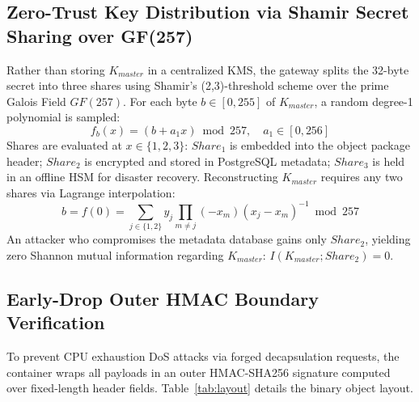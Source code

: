 \documentclass{llncs}
\begin{document}
\subsection{Zero-Trust Key Distribution via Shamir Secret Sharing over GF(257)}
Rather than storing $K_{master}$ in a centralized KMS, the gateway splits the 32-byte secret into three shares using Shamir's (2,3)-threshold scheme over the prime Galois Field $GF(257)$. For each byte $b \in [0, 255]$ of $K_{master}$, a random degree-1 polynomial is sampled:
\begin{equation}
f_b(x) = (b + a_1 x) \bmod 257, \quad a_1 \in [0, 256]
\end{equation}
Shares are evaluated at $x \in \{1, 2, 3\}$: $Share_1$ is embedded into the object package header; $Share_2$ is encrypted and stored in PostgreSQL metadata; $Share_3$ is held in an offline HSM for disaster recovery. Reconstructing $K_{master}$ requires any two shares via Lagrange interpolation:
\begin{equation}
b = f(0) = \sum_{j \in \{1,2\}} y_j \prod_{m \neq j} (-x_m)(x_j - x_m)^{-1} \bmod 257
\end{equation}
An attacker who compromises the metadata database gains only $Share_2$, yielding zero Shannon mutual information regarding $K_{master}$: $I(K_{master}; Share_2) = 0$.

\subsection{Early-Drop Outer HMAC Boundary Verification}
To prevent CPU exhaustion DoS attacks via forged decapsulation requests, the container wraps all payloads in an outer HMAC-SHA256 signature computed over fixed-length header fields. Table~\ref{tab:layout} details the binary object layout.
\end{document}
